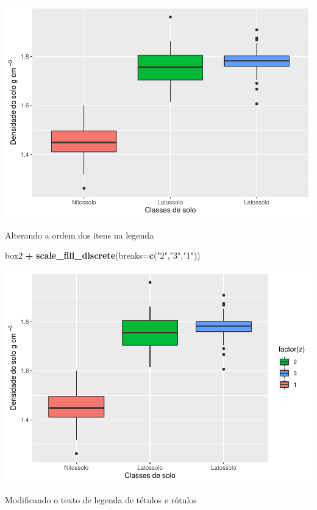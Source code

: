 \documentclass[
]{book}
\newenvironment{Shaded}{\begin{snugshade}}{\end{snugshade}}
\newcommand{\DataTypeTok}[1]{\textcolor[rgb]{0.13,0.29,0.53}{#1}}
\newcommand{\KeywordTok}[1]{\textcolor[rgb]{0.13,0.29,0.53}{\textbf{#1}}}
\newcommand{\NormalTok}[1]{#1}
\newcommand{\OperatorTok}[1]{\textcolor[rgb]{0.81,0.36,0.00}{\textbf{#1}}}
\newcommand{\StringTok}[1]{\textcolor[rgb]{0.31,0.60,0.02}{#1}}
\begin{document}
\includegraphics{TudodoR_files/figure-latex/unnamed-chunk-210-1.pdf}

Alterando a ordem dos itens na legenda

\begin{Shaded}
\begin{Highlighting}[]
\NormalTok{box2 }\OperatorTok{+}\StringTok{ }\KeywordTok{scale_fill_discrete}\NormalTok{(}\DataTypeTok{breaks=}\KeywordTok{c}\NormalTok{(}\StringTok{"2"}\NormalTok{,}\StringTok{"3"}\NormalTok{,}\StringTok{"1"}\NormalTok{))}
\end{Highlighting}
\end{Shaded}

\includegraphics{TudodoR_files/figure-latex/unnamed-chunk-211-1.pdf}

Modificando o texto de legenda de tétulos e rótulos
\end{document}

